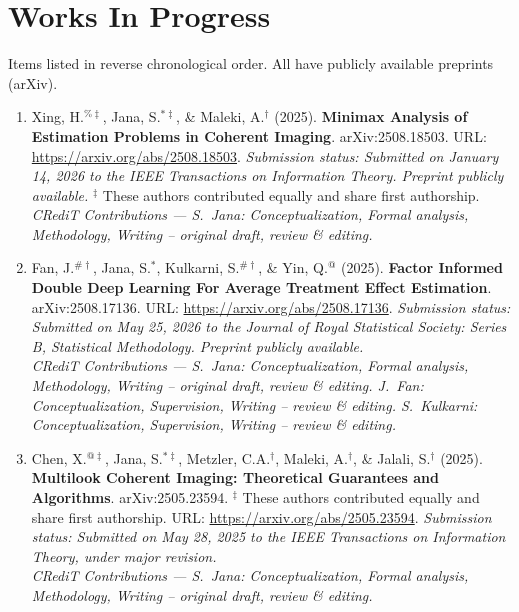 \documentclass[letterpaper,oneside]{article}
\begin{document}
\section*{Works In Progress}

\noindent Items listed in reverse chronological order. All have publicly available preprints (arXiv).

\begin{enumerate}[leftmargin=*,label=P\arabic*.]

  \item Xing, H.$^{\%\ddagger}$, Jana, S.$^{*\ddagger}$, \& Maleki, A.$^\dagger$ (2025). {\textbf{Minimax Analysis of Estimation Problems in Coherent Imaging}}. arXiv:2508.18503. URL: \href{https://arxiv.org/abs/2508.18503}{https://arxiv.org/abs/2508.18503}. \textit{Submission status: Submitted on January 14, 2026 to the IEEE Transactions on Information Theory. Preprint publicly available.} $^{\ddagger}$ These authors contributed equally and share first authorship.\\
  \textit{CRediT Contributions --- S.~Jana: Conceptualization, Formal analysis, Methodology, Writing -- original draft, review \& editing.} 

  \item Fan, J.$^{\#\dagger}$, Jana, S.$^*$, Kulkarni, S.$^{\#\dagger}$, \& Yin, Q.$^@$ (2025). {\textbf{Factor Informed Double Deep Learning For Average Treatment Effect Estimation}}. arXiv:2508.17136. URL: \href{https://arxiv.org/abs/2508.17136}{https://arxiv.org/abs/2508.17136}. \textit{Submission status: Submitted on May 25, 2026 to the Journal of Royal Statistical Society: Series B, Statistical Methodology. Preprint publicly available.}\\
  \textit{CRediT Contributions --- S.~Jana: Conceptualization, Formal analysis, Methodology, Writing -- original draft, review \& editing. J.~Fan: Conceptualization, Supervision, Writing -- review \& editing. S.~Kulkarni: Conceptualization, Supervision, Writing -- review \& editing.}

  \item Chen, X.$^{@\ddagger}$, Jana, S.$^{*\ddagger}$, Metzler, C.A.$^\dagger$, Maleki, A.$^\dagger$, \& Jalali, S.$^\dagger$ (2025). {\textbf{Multilook Coherent Imaging: Theoretical Guarantees and Algorithms}}. arXiv:2505.23594. $^{\ddagger}$ These authors contributed equally and share first authorship. URL: \href{https://arxiv.org/abs/2505.23594}{https://arxiv.org/abs/2505.23594}. \textit{Submission status: Submitted on May 28, 2025 to the IEEE Transactions on Information Theory, under major revision.}  \\
  \textit{CRediT Contributions --- S.~Jana: Conceptualization, Formal analysis, Methodology, Writing -- original draft, review \& editing.} 


\end{enumerate}
\end{document}
